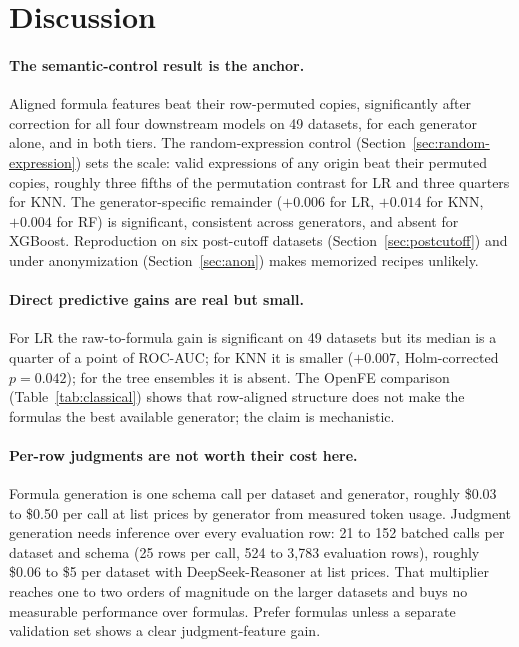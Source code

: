 \section{Discussion}\label{sec:discussion}

\paragraph{The semantic-control result is the anchor.}

Aligned formula features beat their row-permuted copies, significantly after correction for all four downstream models on 49 datasets, for each generator alone, and in both tiers. The random-expression control (Section~\ref{sec:random-expression}) sets the scale: valid expressions of any origin beat their permuted copies, roughly three fifths of the permutation contrast for LR and three quarters for KNN. The generator-specific remainder (\(+0.006\) for LR, \(+0.014\) for KNN, \(+0.004\) for RF) is significant, consistent across generators, and absent for XGBoost. Reproduction on six post-cutoff datasets (Section~\ref{sec:postcutoff}) and under anonymization (Section~\ref{sec:anon}) makes memorized recipes unlikely.

\paragraph{Direct predictive gains are real but small.}

For LR the raw-to-formula gain is significant on 49 datasets but its median is a quarter of a point of ROC-AUC; for KNN it is smaller (\(+0.007\), Holm-corrected \(p = 0.042\)); for the tree ensembles it is absent. The OpenFE comparison (Table~\ref{tab:classical}) shows that row-aligned structure does not make the formulas the best available generator; the claim is mechanistic.

\paragraph{Per-row judgments are not worth their cost here.}

Formula generation is one schema call per dataset and generator, roughly \$0.03 to \$0.50 per call at list prices by generator from measured token usage. Judgment generation needs inference over every evaluation row: 21 to 152 batched calls per dataset and schema (25 rows per call, 524 to 3,783 evaluation rows), roughly \$0.06 to \$5 per dataset with DeepSeek-Reasoner at list prices. That multiplier reaches one to two orders of magnitude on the larger datasets and buys no measurable performance over formulas. Prefer formulas unless a separate validation set shows a clear judgment-feature gain.

